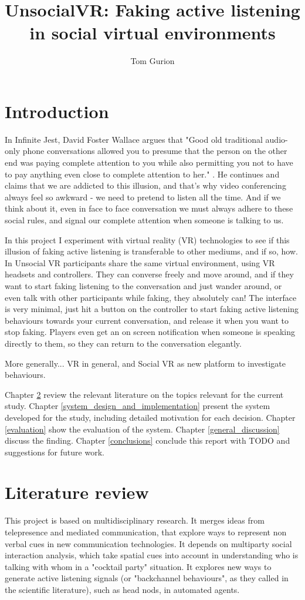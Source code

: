 \documentclass[]{simple-thesis}
\title{UnsocialVR: Faking active listening in social virtual environments}
\author{Tom Gurion}
\affiliation{Media and Arts Technology\\Queen Mary University of London}
\begin{document}
\frontmatter{}  %


\chapter{Introduction}

In Infinite Jest, David Foster Wallace argues that "Good old traditional audio-only phone conversations allowed you to presume that the person on the other end was paying complete attention to you while also permitting you not to have to pay anything even close to complete attention to her." \citep{Wallace1996}.
He continues and claims that we are addicted to this illusion, and that's why video conferencing always feel so awkward - we need to pretend to listen all the time.
And if we think about it, even in face to face conversation we must always adhere to these social rules, and signal our complete attention when someone is talking to us.

In this project I experiment with virtual reality (VR) technologies to see if this illusion of faking active listening is transferable to other mediums, and if so, how.
In Unsocial VR participants share the same virtual environment, using VR headsets and controllers.
They can converse freely and move around, and if they want to start faking listening to the conversation and just wander around, or even talk with other participants while faking, they absolutely can!
The interface is very minimal, just hit a button on the controller to start faking active listening behaviours towards your current conversation, and release it when you want to stop faking.
Players even get an on screen notification when someone is speaking directly to them, so they can return to the conversation elegantly.

More generally...
VR in general, and Social VR as new platform to investigate behaviours.

Chapter \ref{literature_review} review the relevant literature on the topics relevant for the current study.
Chapter \ref{system_design_and_implementation} present the system developed for the study, including detailed motivation for each decision.
Chapter \ref{evaluation} show the evaluation of the system.
Chapter \ref{general_discussion} discuss the finding.
Chapter \ref{conclusions} conclude this report with TODO and suggestions for future work.


\chapter{Literature review}\label{literature_review}
This project is based on multidisciplinary research.
It merges ideas from telepresence and mediated communication, that explore ways to represent non verbal cues in new communication technologies.
It depends on multiparty social interaction analysis, which take spatial cues into account in understanding who is talking with whom in a "cocktail party" situation.
It explores new ways to generate active listening signals (or "backchannel behaviours", as they called in the scientific literature), such as head nods, in automated agents.
\end{document}
